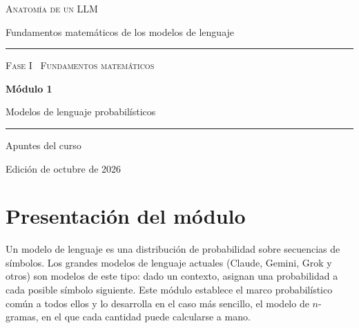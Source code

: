 \documentclass[11pt,a4paper,twoside,openany]{book}
\begin{document}
\frontmatter
\begin{titlepage}
\centering
\vspace*{2.5cm}
{\large\scshape Anatomía de un LLM}\par
\vspace{0.4cm}
{\normalsize Fundamentos matemáticos de los modelos de lenguaje}\par
\vspace{2.2cm}
\rule{\textwidth}{0.8pt}\par\vspace{0.5cm}
{\small\scshape Fase I \textperiodcentered\ Fundamentos matemáticos}\par\vspace{0.3cm}
{\Huge\bfseries Módulo 1\par}\vspace{0.3cm}
{\LARGE Modelos de lenguaje probabilísticos\par}
\vspace{0.5cm}\rule{\textwidth}{0.4pt}\par
\vspace{1.6cm}
{\large Apuntes del curso}\par
\vfill
{\small Edición de octubre de 2026}\par
\end{titlepage}

\chapter*{Presentación del módulo}

Un modelo de lenguaje es una distribución de probabilidad sobre secuencias de símbolos. Los grandes modelos de lenguaje actuales (Claude, Gemini, Grok y otros) son modelos de este tipo: dado un contexto, asignan una probabilidad a cada posible símbolo siguiente. Este módulo establece el marco probabilístico común a todos ellos y lo desarrolla en el caso más sencillo, el modelo de $n$-gramas, en el que cada cantidad puede calcularse a mano.
\end{document}
